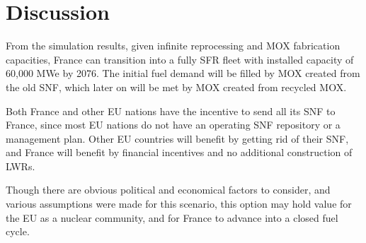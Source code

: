 \section{Discussion}
From the simulation results, given infinite
reprocessing and \gls{MOX} fabrication capacities,
France can transition into a fully \gls{SFR} fleet
with installed capacity of 60,000 MWe by 2076.
The initial fuel demand will be filled by \gls{MOX}
created from the old \gls{SNF}, which later on
will be met by \gls{MOX} created from recycled \gls{MOX}.

Both France and other EU nations have the incentive
to send all its \gls{SNF} to France, since most EU nations do not have an 
operating \gls{SNF} repository or a management plan.
Other EU countries will benefit by getting rid of their \gls{SNF},
and France will benefit by financial incentives and no additional 
construction of \gls{LWR}s.

Though there are obvious political and economical factors to consider,
and various assumptions were made for this scenario, this option
may hold value for the EU as a nuclear community,
and for France to advance into a closed fuel cycle.